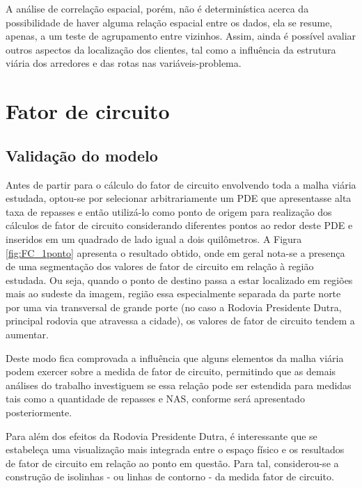 A análise de correlação espacial, porém, não é determinística acerca da possibilidade de haver alguma relação espacial entre os dados, ela se resume, apenas, a um teste de agrupamento entre vizinhos.
Assim, ainda é possível avaliar outros aspectos da localização dos clientes, tal como a influência da estrutura viária dos arredores e das rotas nas variáveis-problema.

\section{Fator de circuito} \label{sec:AMBEV_FC}

\subsection{Validação do modelo}

Antes de partir para o cálculo do fator de circuito envolvendo toda a malha viária estudada, optou-se por selecionar arbitrariamente um PDE que apresentasse alta taxa de repasses e então utilizá-lo como ponto de origem para realização dos cálculos de fator de circuito considerando diferentes pontos ao redor deste PDE e inseridos em um quadrado de lado igual a dois quilômetros.
%
A Figura \ref{fig:FC_1ponto} apresenta o resultado obtido, onde em geral nota-se a presença de uma segmentação dos valores de fator de circuito em relação à região estudada. 
Ou seja, quando o ponto de destino passa a estar localizado em regiões mais ao sudeste da imagem, região essa especialmente separada da parte norte por uma via transversal de grande porte (no caso a Rodovia Presidente Dutra, principal rodovia que atravessa a cidade), os valores de fator de circuito tendem a aumentar.
%

Deste modo fica comprovada a influência que alguns elementos da malha viária podem exercer sobre a medida de fator de circuito, permitindo que as demais análises do trabalho investiguem se essa relação pode ser estendida para medidas tais como a quantidade de repasses e NAS, conforme será apresentado posteriormente.

Para além dos efeitos da Rodovia Presidente Dutra, é interessante que se estabeleça uma visualização mais integrada entre o espaço físico e os resultados de fator de circuito em relação ao ponto em questão.
Para tal, considerou-se a construção de isolinhas - ou linhas de contorno - da medida fator de circuito. 

